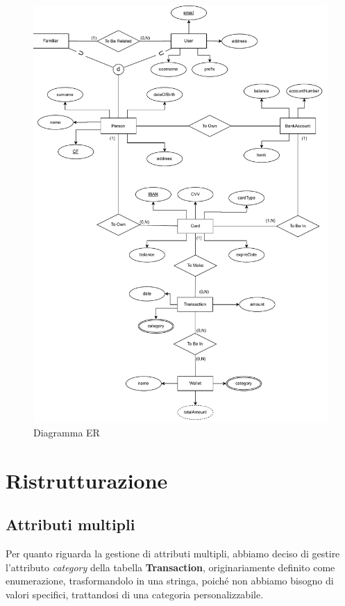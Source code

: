 \begin{figure}[!h]
    \centering
    \includegraphics[scale=0.7]{pdfs/ERdiagram.drawio.pdf}
    \caption{Diagramma ER}\label{ER}
\end{figure}

\newpage

\section{Ristrutturazione}

\subsection{Attributi multipli}

Per quanto riguarda la gestione di attributi multipli,
abbiamo deciso di gestire l'attributo \textit{category} della tabella
\textbf{Transaction}, originariamente definito come enumerazione,
trasformandolo in una stringa, poiché non abbiamo bisogno di valori
specifici, trattandosi di una categoria personalizzabile.

